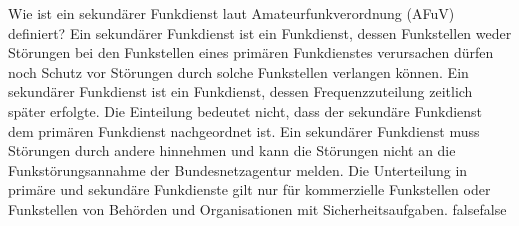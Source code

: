     {Wie ist ein sekundärer Funkdienst laut Amateurfunkverordnung (AFuV) definiert?}
    {Ein sekundärer Funkdienst ist ein Funkdienst, dessen Funkstellen weder Störungen bei den Funkstellen eines primären Funkdienstes verursachen dürfen noch Schutz vor Störungen durch solche Funkstellen verlangen können.}
    {Ein sekundärer Funkdienst ist ein Funkdienst, dessen Frequenzzuteilung zeitlich später erfolgte. Die Einteilung bedeutet nicht, dass der sekundäre Funkdienst dem primären Funkdienst nachgeordnet ist.}
    {Ein sekundärer Funkdienst muss Störungen durch andere hinnehmen und kann die Störungen nicht an die Funkstörungsannahme der Bundesnetzagentur melden.}
    {Die Unterteilung in primäre und sekundäre Funkdienste gilt nur für kommerzielle Funkstellen oder Funkstellen von Behörden und Organisationen mit Sicherheitsaufgaben.}
    {false}{false}